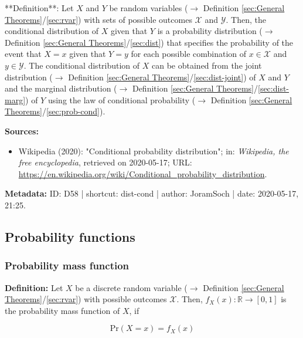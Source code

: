 \documentclass[a4paper,12pt,twoside]{book}
\begin{document}
**Definition**: Let $X$ and $Y$ be random variables ($\rightarrow$ Definition \ref{sec:General Theorems}/\ref{sec:rvar}) with sets of possible outcomes $\mathcal{X}$ and $\mathcal{Y}$. Then, the conditional distribution of $X$ given that $Y$ is a probability distribution ($\rightarrow$ Definition \ref{sec:General Theorems}/\ref{sec:dist}) that specifies the probability of the event that $X = x$ given that $Y = y$ for each possible combination of $x \in \mathcal{X}$ and $y \in \mathcal{Y}$. The conditional distribution of $X$ can be obtained from the joint distribution ($\rightarrow$ Definition \ref{sec:General Theorems}/\ref{sec:dist-joint}) of $X$ and $Y$ and the marginal distribution ($\rightarrow$ Definition \ref{sec:General Theorems}/\ref{sec:dist-marg}) of $Y$ using the law of conditional probability ($\rightarrow$ Definition \ref{sec:General Theorems}/\ref{sec:prob-cond}).


\vspace{1em}
\textbf{Sources:}
\begin{itemize}
\item Wikipedia (2020): "Conditional probability distribution"; in: \textit{Wikipedia, the free encyclopedia}, retrieved on 2020-05-17; URL: \url{https://en.wikipedia.org/wiki/Conditional_probability_distribution}.
\end{itemize}


\vspace{1em}
\textbf{Metadata:} ID: D58 | shortcut: dist-cond | author: JoramSoch | date: 2020-05-17, 21:25.
\vspace{1em}



\subsection{Probability functions}

\subsubsection[\textit{Probability mass function}]{Probability mass function} \label{sec:pmf}
\setcounter{equation}{0}

\textbf{Definition:} Let $X$ be a discrete random variable ($\rightarrow$ Definition \ref{sec:General Theorems}/\ref{sec:rvar}) with possible outcomes $\mathcal{X}$. Then, $f_X(x): \mathbb{R} \to [0,1]$ is the probability mass function of $X$, if

\begin{equation} \label{eq:pmf-pmf-def-s1}
\mathrm{Pr}(X = x) = f_X(x)
\end{equation}
\end{document}
